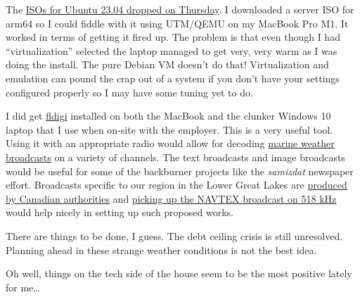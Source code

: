 The \href{https://xubuntu.org/news/xubuntu-23-04-released/}{ISOs for
Ubuntu 23.04 dropped on Thursday}. I downloaded a server ISO for arm64
so I could fiddle with it using UTM/QEMU on my MacBook Pro M1. It worked
in terms of getting it fired up. The problem is that even though I had
``virtualization'' selected the laptop managed to get very, very warm as
I was doing the install. The pure Debian VM doesn't do that!
Virtualization and emulation can pound the crap out of a system if you
don't have your settings configured properly so I may have some tuning
yet to do.

I did get
\href{https://en.wikipedia.org/w/index.php?title=Fldigi&oldid=1148184949}{fldigi}
installed on both the MacBook and the clunker Windows 10 laptop that I
use when on-site with the employer. This is a very useful tool. Using it
with an appropriate radio would allow for decoding
\href{https://www.weather.gov/marine/uscg_broadcasts}{marine weather
broadcasts} on a variety of channels. The text broadcasts and image
broadcasts would be useful for some of the backburner projects like the
\emph{samizdat} newspaper effort. Broadcasts specific to our region in
the Lower Great Lakes are
\href{https://www.canada.ca/en/environment-climate-change/services/general-marine-weather-information/understanding-forecasts/regional/products-services-great-lakes.html}{produced
by Canadian authorities} and
\href{https://www.ccg-gcc.gc.ca/publications/mcts-sctm/ramn-arnm/part4-eng.html}{picking
up the NAVTEX broadcast on 518 kHz} would help nicely in setting up such
proposed works.

There are things to be done, I guess. The debt ceiling crisis is still
unresolved. Planning ahead in these strange weather conditions is not
the best idea.

Oh well, things on the tech side of the house seem to be the most
positive lately for me\ldots{}
